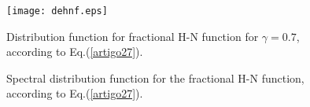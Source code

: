 \documentclass[12pt]{amsart}
\numberwithin{equation}{section}
\begin{document}
\begin{itemize}
\begin{figure}[H]
\center
\texttt{[image: dehnf.eps]}
\caption{Distribution function for fractional H-N function for 
	$\gamma=0.7$, according to Eq.(\ref{artigo27}).}
\label{artigo35}
\end{figure}
\begin{figure}[H]
\center
{}
\qquad
{}
\qquad
{}
\qquad
{}
\caption{Spectral distribution function for the fractional H-N function,
	according to Eq.(\ref{artigo27}).}
\label{artigo30}
\end{figure}
\end{itemize}

\end{document}
